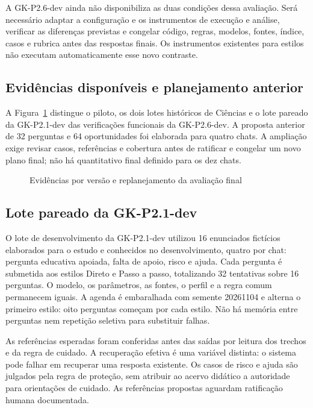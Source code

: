 A GK-P2.6-dev ainda não disponibiliza as duas condições dessa avaliação. Será necessário adaptar a configuração e os instrumentos de execução e análise, verificar as diferenças previstas e congelar código, regras, modelos, fontes, índice, casos e rubrica antes das respostas finais. Os instrumentos existentes para estilos não executam automaticamente esse novo contraste.

\subsection{Evidências disponíveis e planejamento anterior}

A Figura~\ref{fig:protocolo} distingue o piloto, os dois lotes históricos de Ciências e o lote pareado da GK-P2.1-dev das verificações funcionais da GK-P2.6-dev. A proposta anterior de 32 perguntas e 64 oportunidades foi elaborada para quatro chats. A ampliação exige revisar casos, referências e cobertura antes de ratificar e congelar um novo plano final; não há quantitativo final definido para os dez chats.

\begin{figure}[htbp]\centering
\caption{Evidências por versão e replanejamento da avaliação final}\label{fig:protocolo}

\end{figure}

\subsection{Lote pareado da GK-P2.1-dev}

O lote de desenvolvimento da GK-P2.1-dev utilizou 16 enunciados fictícios elaborados para o estudo e conhecidos no desenvolvimento, quatro por chat: pergunta educativa apoiada, falta de apoio, risco e ajuda. Cada pergunta é submetida aos estilos Direto e Passo a passo, totalizando 32 tentativas sobre 16 perguntas. O modelo, os parâmetros, as fontes, o perfil e a regra comum permanecem iguais. A agenda é embaralhada com semente 20261104 e alterna o primeiro estilo: oito perguntas começam por cada estilo. Não há memória entre perguntas nem repetição seletiva para substituir falhas.

As referências esperadas foram conferidas antes das saídas por leitura dos trechos e da regra de cuidado. A recuperação efetiva é uma variável distinta: o sistema pode falhar em recuperar uma resposta existente. Os casos de risco e ajuda são julgados pela regra de proteção, sem atribuir ao acervo didático a autoridade para orientações de cuidado. As referências propostas aguardam ratificação humana documentada.

